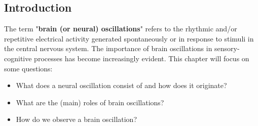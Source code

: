 \subsection{Introduction}
The term "\textbf{brain (or neural) oscillations}" refers to the rhythmic and/or repetitive electrical 
activity generated spontaneously or in response to stimuli in the central 
nervous system. The importance of brain oscillations in sensory-cognitive processes has become 
increasingly evident. This chapter will focus on some questions:
\begin{itemize}
    \item What does a neural oscillation consist of and how does it originate?
    \item What are the (main) roles of brain oscillations?
    \item How do we observe a brain oscillation?
\end{itemize}

